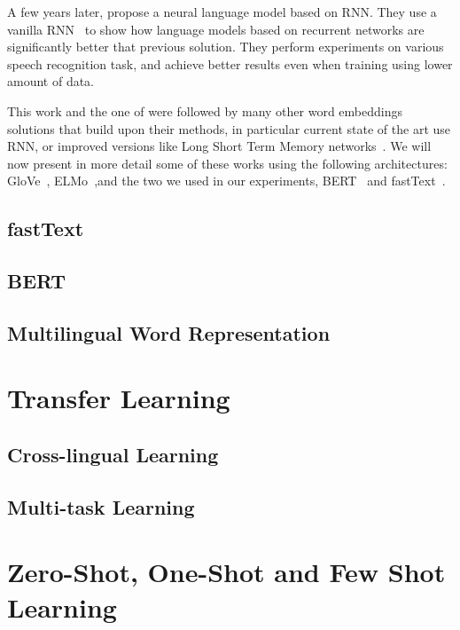 A few years later, \citet{Mikolov2010RecurrentNN} propose a neural language model based on RNN. They use a vanilla RNN~\citep{elman1990finding} to show how language models based on recurrent networks are significantly better that previous solution. They perform experiments on various speech recognition task, and achieve better results even when training using lower amount of data.

This work and the one of \cite{bengio2000nnlm} were followed by many other word embeddings solutions that build upon their methods, in particular current state of the art use RNN, or improved versions like Long Short Term Memory networks~\citep{hochreiter1997long}. We will now present in more detail some of these works using the following architectures: GloVe~\citep{pennington2014glove}, ELMo~\citep{peters2018elmo},and the two we used in our experiments, BERT~\citep{devlin2018bert} and fastText~\citep{bojanowski2016enriching}.



\subsection{fastText}
\subsection{BERT}


\subsection{Multilingual Word Representation}

\section{Transfer Learning}
\label{sec:transfer_learning}
\subsection{Cross-lingual Learning}
\subsection{Multi-task Learning}
 
\section{Zero-Shot, One-Shot and Few Shot Learning} 
\label{sec:zero_learning}

